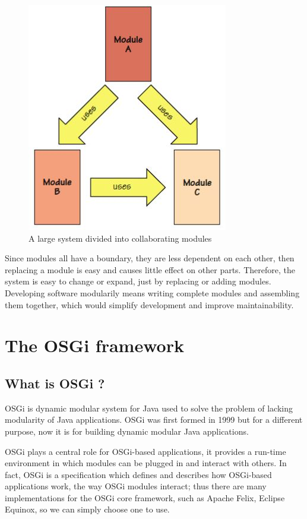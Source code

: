 \begin{figure}
	\centering
		\includegraphics{image/modules.JPG}
	\caption{A large system divided into collaborating modules}
	\label{fig:modules}
\end{figure}

Since modules all have a boundary, they are less dependent on each other, then replacing a module is easy and causes little effect on other parts. Therefore, the system is easy to change or expand, just by replacing or adding modules. Developing software modularily means writing complete modules and assembling them together, which would simplify development and improve maintainability.

\section{The OSGi framework}

\subsection{What is OSGi ?}
OSGi is dynamic modular system for Java used to solve the problem of lacking modularity of Java applications. OSGi was first formed in 1999 but for a different purpose, now it is for building dynamic modular Java applications.

OSGi plays a central role for OSGi-based applications, it provides a run-time environment in which modules can be plugged in and interact with others. In fact, OSGi is a specification which defines and describes how OSGi-based applications work, the way OSGi modules interact; thus there are many implementations for the OSGi core framework, such as Apache Felix, Eclipse Equinox, so we can simply choose one to use.

